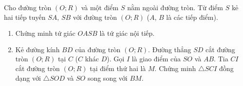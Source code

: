 \begin{bt}[2,5 điểm]%
	Cho đường tròn $(O;R)$ và một điểm $S$ nằm ngoài đường tròn. Từ điểm $S$ kẻ hai tiếp tuyến $SA$, $SB$ với đường tròn $(O;R)$ ($A$, $B$ là các tiếp điểm).
	\begin{enumerate}
		\item Chứng minh tứ giác $O A S B$ là tứ giác nội tiếp.
		\item Kẻ đường kính $BD$ của đường tròn $(O;R)$. Đường thẳng $SD$ cắt đường tròn $(O;R)$ tại $C$ ($C$ khác $D$). Gọi $I$ là giao điểm của $S O$ và $A B$. Tia $CI$ cắt đường tròn $(O;R)$ tại điểm thứ hai là $M$. Chứng minh $\triangle SCI$ đồng dạng với $\triangle SOD$ và $SO$ song song với $BM$.
	\end{enumerate}
\end{bt}
